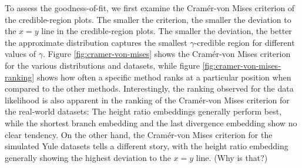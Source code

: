 \documentclass[10pt,letterpaper]{article}
\begin{document}
To assess the goodness-of-fit, we first examine the Cramér-von Mises criterion of the credible-region plots. The smaller the criterion, the smaller the deviation to the $x=y$ line in the credible-region plots. The smaller the deviation, the better the approximate distribution captures the smallest $\gamma$-credible region for different values of $\gamma$. Figure \ref{fig:cramer-von-mises} shows the Cramér-von Mises criterion for the various distributions and datasets, while figure \ref{fig:cramer-von-mises-ranking} shows how often a specific method ranks at a particular position when compared to the other methods. Interestingly, the ranking observed for the data likelihood is also apparent in the ranking of the Cramér-von Mises criterion for the real-world datasets: The height ratio embeddings generally perform best, while the shortest branch embedding and the last divergence embedding show no clear tendency. On the other hand, the Cramér-von Mises criterion for the simulated Yule datasets tells a different story, with the height ratio embedding generally showing the highest deviation to the $x=y$ line. (Why is that?)
\end{document}

